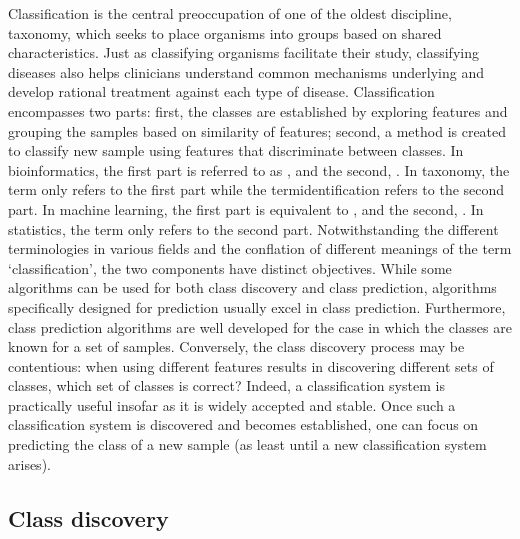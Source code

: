 Classification is the central preoccupation of one of the oldest discipline, taxonomy, which seeks to place organisms into groups based on shared characteristics. Just as classifying organisms facilitate their study, classifying diseases also helps clinicians understand common mechanisms underlying and develop rational treatment against each type of disease. Classification encompasses two parts: first, the classes are established by exploring features and grouping the samples based on similarity of features; second, a method is created to classify new sample using features that discriminate between classes. In bioinformatics, the first part is referred to as , and the second, . In taxonomy, the term  only refers to the first part while the term{identification} refers to the second part. In machine learning, the first part is equivalent to , and the second, . In statistics, the term  only refers to the second part. Notwithstanding the different terminologies in various fields and the conflation of different meanings of the term `classification', the two components have distinct objectives. While some algorithms can be used for both class discovery and class prediction, algorithms specifically designed for prediction usually excel in class prediction. Furthermore, class prediction algorithms are well developed for the case in which the classes are known for a set of samples. Conversely, the class discovery process may be contentious: when using different features results in discovering different sets of classes, which set of classes is correct? Indeed, a classification system is practically useful insofar as it is widely accepted and stable. Once such a classification system is discovered and becomes established, one can focus on predicting the class of a new sample (as least until a new classification system arises).

\subsection{Class discovery}

